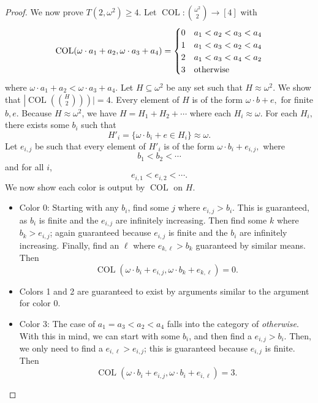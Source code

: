 \documentclass[10pt,a4paper]{article}
\newcommand{\om}{\omega}
\newcommand{\oequiv}{\approx}
\newcommand{\COL}{\operatorname{COL}}
\newcommand{\commonconst}{a}
\newcommand{\rareconst}{b}
\theoremstyle{plain}
\theoremstyle{definition}
\begin{document}
\begin{proof}
We now prove $T\left(2, \om^2\right) \geq  4$.
Let $\COL \colon \binom{\om^2}{2} \to [4]$ with \begin{align*}
\COL(\om \cdot \commonconst_1 + \commonconst_2, \om \cdot \commonconst_3 + \commonconst_4) = 
\begin{cases}
0 & \commonconst_1 < \commonconst_2 < \commonconst_3 < \commonconst_4\\
1 & \commonconst_1 < \commonconst_3 < \commonconst_2 < \commonconst_4\\
2 & \commonconst_1 < \commonconst_3 < \commonconst_4 < \commonconst_2\\
3 & \textnormal{otherwise}
\end{cases}
\end{align*}
where $\om \cdot \commonconst_1 + \commonconst_2 < \om \cdot \commonconst_3 + \commonconst_4$. 
Let $H \subseteq \omega^2$ be any set such that $H\oequiv \omega^2$. 
We show that $\left|\COL\left(\binom{H}{2}\right)\right)|=4$. Every element of $H$ is of the form $\omega \cdot \rareconst + e,$ for finite $\rareconst,e.$ Because $H \oequiv \om^2$, we have $H = H_1+H_2+ \cdots$ where each $H_i \oequiv \omega$. For each $H_i,$ there exists some $\rareconst_i$ such that $$
H'_i = \{\omega \cdot \rareconst_i + e \in H_i\} \oequiv \om.
$$ Let $e_{i,j}$ be such that every element of $H'_i$ is of the form $\omega \cdot \rareconst_i + e_{i,j},$
where
$$\rareconst_1 < \rareconst_2 < \cdots$$
and for all $i$, 
$$e_{i,1} < e_{i,2} < \cdots.$$
We now show each color is output by $\COL$ on $H$.
\begin{itemize}
    \item Color 0: Starting with any $\rareconst_i$, find some $j$ where $e_{i, j} > \rareconst_i$. This is guaranteed, as $\rareconst_i$ is finite and the $e_{i, j}$ are infinitely increasing. Then find some $k$ where $\rareconst_k > e_{i, j}$; again guaranteed because $e_{i, j}$ is finite and the $\rareconst_i$ are infinitely increasing. Finally, find an
    $\ell$ where $e_{k ,\ell} > \rareconst_k$ guaranteed by similar means. Then 
    $$\COL(\omega\cdot \rareconst_i + e_{i, j}, \omega\cdot \rareconst_k + e_{k, \ell})=0.$$
    \item Colors 1 and 2 are guaranteed to exist by arguments similar to the argument for color 0.
    \item Color 3: The case of $\commonconst_1=\commonconst_3<\commonconst_2<\commonconst_4$ falls into the category of {\it otherwise}. With this in mind, we can start with some $\rareconst_i$, and then find a $e_{i, j} > \rareconst_i$. Then, we only need to find a $e_{i, \ell} > e_{i, j}$; this is guaranteed because $e_{i, j}$ is finite. Then $$\COL(\omega\cdot \rareconst_i + e_{i, j}, \omega\cdot \rareconst_i + e_{i, \ell})=3.$$
\end{itemize}

 
\end{proof}
\end{document}
